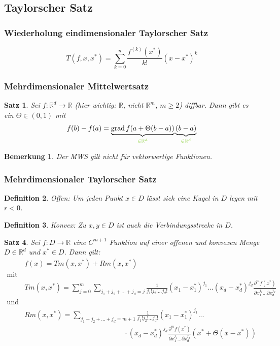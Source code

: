 \documentclass[12pt,a4paper]{report}%
\DeclareMathOperator{\grad}{grad}
\newtheorem{satz}{Satz}[section]
\newtheorem{definition}[satz]{Definition}
\newtheorem{bem}{Bemerkung}[section]
\numberwithin{equation}{section}
\newcommand{\R}{\mathbb{R}} %
\newcommand{\diffp}{\partial}
\def\colGreen#1{\begingroup\color{LimeGreen}{#1}\endgroup}
\def\ubGreen#1#2{\underbrace{#2}_{\colGreen{#1}}}
\numberwithin{equation}{subsection}
\begin{document}
  \subsection{Taylorscher Satz}
  \subsubsection{Wiederholung eindimensionaler Taylorscher Satz}
  \begin{equation}
    T(f, x, x^*) = \sum\limits_{k= 0}^n \frac{f^{(k)}(x^*)}{k!} (x-x^*)^k
  \end{equation}
  \subsubsection{Mehrdimensionaler Mittelwertsatz}
  \begin{satz}
    Sei $f: \R^d \rightarrow \R$ (hier wichtig: $\R$, nicht $\R^m$, $m\geq 2$) diffbar. Dann gibt es ein $\Theta\in (0,1)$ mit 
    \begin{equation}
      f(b) - f(a) = \ubGreen{\in \R^d}{\grad f(a+\Theta (b-a))}\ubGreen{\in \R^d}{(b-a)}
    \end{equation}
  \end{satz}
  \begin{bem}
    Der MWS gilt nicht für vektorwertige Funktionen.
  \end{bem}
  
  \subsubsection{Mehrdimensionaler Taylorscher Satz}
  \begin{definition}
    Offen: Um jeden Punkt $x \in D$ lässt sich eine Kugel in $D$ legen mit $r < 0$.
  \end{definition}
  \begin{definition}
    Konvex: Zu $x, y \in D$ ist auch die Verbindungsstrecke in $D$.
  \end{definition}
      
  \begin{satz}
    Sei $f: D\rightarrow \R$ eine $C^{m+1}$ Funktion auf einer offenen und konvexen Menge $D \in \R^d$ und $x^* \in D$. Dann gilt:
    \begin{align}
    &f(x) = Tm(x, x^*) + Rm(x, x^*) \\
    \text{mit} \nonumber \\
    &Tm(x, x^*) = \sum\limits_{j=0}^{m} \sum\limits_{j_1+j_2+...+j_d = j} \frac{1}{j_1!j_2!...j_d!} (x_1 - x_1^*)^{j_1} ... (x_d - x_d^*)^{j_d} \frac{\diffp^m f(x^*)}{\diffp x_1^{j_1} ... \diffp x_d^{j_d}} &\\
    \text{und} \nonumber \\
    &Rm(x, x^*) = \sum\limits_{j_1+j_2+...+j_d = m+1} \frac{1}{j_1!j_2!...j_d!} (x_1 - x_1^*)^{j_1} ...\nonumber \\ 
    &\qquad \qquad \qquad \qquad \qquad \qquad \qquad \cdot(x_d - x_d^*)^{j_d} \frac{\diffp^m f(x^*)}{\diffp x_1^{j_1} ... \diffp x_d^{j_d}}(x^* + \Theta(x-x^*))
    \end{align}
  \end{satz}
  
\end{document}
